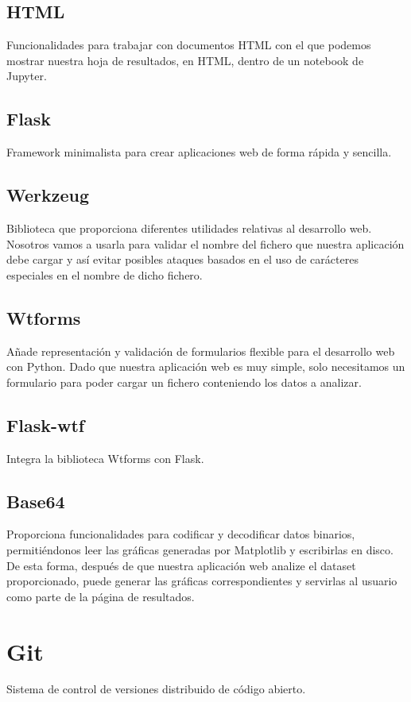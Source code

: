 \subsection{HTML}
Funcionalidades para trabajar con documentos HTML con el que podemos mostrar nuestra hoja de resultados, en HTML, dentro de un notebook de Jupyter.

\subsection{Flask}
Framework minimalista para crear aplicaciones web de forma rápida y sencilla.

\subsection{Werkzeug}
Biblioteca que proporciona diferentes utilidades relativas al desarrollo web. Nosotros vamos a usarla para validar el nombre del fichero que nuestra aplicación debe cargar y así evitar posibles ataques basados en el uso de carácteres especiales en el nombre de dicho fichero.

\subsection{Wtforms}
Añade representación y validación de formularios flexible para el desarrollo web con Python. Dado que nuestra aplicación web es muy simple, solo necesitamos un formulario para poder cargar un fichero conteniendo los datos a analizar.

\subsection{Flask-wtf}
Integra la biblioteca Wtforms con Flask.

\subsection{Base64}
Proporciona funcionalidades para codificar y decodificar datos binarios, permitiéndonos leer las gráficas generadas por Matplotlib y escribirlas en disco. De esta forma, después de que nuestra aplicación web analize el dataset proporcionado, puede generar las gráficas correspondientes y servirlas al usuario como parte de la página de resultados.

\section{Git}
Sistema de control de versiones distribuido de código abierto.

